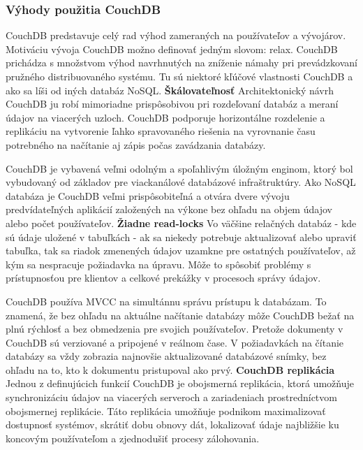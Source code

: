\subsubsection{Výhody použitia CouchDB}
\indent CouchDB predstavuje celý rad výhod zameraných na používateľov a vývojárov. Motiváciu vývoja CouchDB možno definovať jedným slovom: relax. CouchDB prichádza s množstvom výhod navrhnutých na zníženie námahy pri prevádzkovaní pružného distribuovaného systému. Tu sú niektoré kľúčové vlastnosti CouchDB a ako sa líši od iných databáz NoSQL.\newline
\textbf{Škálovateľnosť} \newline
\indent Architektonický návrh CouchDB ju robí mimoriadne prispôsobivou pri rozdeľovaní databáz a meraní údajov na viacerých uzloch. CouchDB podporuje horizontálne rozdelenie a replikáciu na vytvorenie ľahko spravovaného riešenia na vyrovnanie času potrebného na načítanie aj zápis počas zavádzania databázy.

\indent CouchDB je vybavená veľmi odolným a spoľahlivým úložným enginom, ktorý bol vybudovaný od základov pre viackanálové databázové infraštruktúry. Ako NoSQL databáza je CouchDB veľmi prispôsobiteľná a otvára dvere vývoju predvídateľných aplikácií založených na výkone bez ohľadu na objem údajov alebo počet používateľov.\newline
\textbf{Žiadne read-locks} \newline
\indent Vo väčšine relačných databáz - kde sú údaje uložené v tabuľkách - ak sa niekedy potrebuje aktualizovať alebo upraviť tabuľka, tak sa riadok zmenených údajov uzamkne pre ostatných používateľov, až kým sa nespracuje požiadavka na úpravu. Môže to spôsobiť problémy s prístupnosťou pre klientov a celkové prekážky v procesoch správy údajov.

\indent CouchDB používa MVCC na simultánnu správu prístupu k databázam. To znamená, že bez ohľadu na aktuálne načítanie databázy môže CouchDB bežať na plnú rýchlosť a bez obmedzenia pre svojich používateľov. Pretože dokumenty v CouchDB sú verziované a pripojené v reálnom čase. V požiadavkách na čítanie databázy sa vždy zobrazia najnovšie aktualizované databázové snímky, bez ohľadu na to, kto k dokumentu pristupoval ako prvý.\newline
\textbf{CouchDB replikácia} \newline
\indent Jednou z definujúcich funkcií CouchDB je obojsmerná replikácia, ktorá umožňuje synchronizáciu údajov na viacerých serveroch a zariadeniach prostredníctvom obojsmernej replikácie. Táto replikácia umožňuje podnikom maximalizovať dostupnosť systémov, skrátiť dobu obnovy dát, lokalizovať údaje najbližšie ku koncovým používateľom a zjednodušiť procesy zálohovania.

